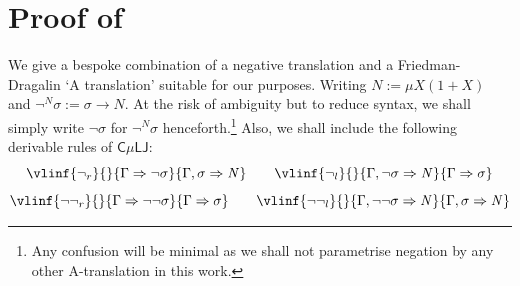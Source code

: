 \documentclass[10pt,a4paper]{amsart}
\theoremstyle{plain}
\theoremstyle{definition}
\newcommand{\dfn}{:=}
\theoremstyle{plain}
\theoremstyle{definition} %
\newcommand{\nat}{\mathit{N}}
\newcommand{\N}{\nat} %
\newcommand{\seqar}{\Rightarrow}
\newcommand{\id}{\mathsf{id}}
\newcommand{\ax}{\id}
\newcommand{\lr}[1]{#1_l}
\newcommand{\rr}[1]{#1_r}
\newcommand{\LJ}{\mathsf{LJ}}
\newcommand{\muLJ}{\mu\LJ}
\newcommand{\circular}{\mathsf C}
\newcommand{\cmuLJ}{\circular\muLJ}
\newcommand{\axiom}[2]{  \vlin{\ax}{}{{#1} \seqar {#2}}{\vlhy{}}}
\newcommand{\haxiom}[2]{ \vlhy{{#1} \seqar {#2}}}
\newcommand{\nega}[1]{\neg^{#1}}
\begin{document}
\section{Proof of~}\label{app:proofs-of-sec-circular-mulj}
% 
\label{subsec:proofs-of-cmulj-into-cmuljminus}



We give a bespoke combination of a negative translation and a Friedman-Dragalin `A translation' suitable for our purposes.
Writing $\N:= \mu X (1+X)$ and $\nega \N \sigma := \sigma \to \N$.
At the risk of ambiguity but to reduce syntax, we shall simply write $\neg \sigma$ for $\nega \N \sigma$ henceforth.\footnote{
Any confusion will be minimal as we shall not parametrise negation by any other A-translation in this work.} Also, we shall include the following derivable rules of $\cmuLJ$:
    \begin{equation}\label{eqn:negation-rules}
         \vlinf{\rr{\neg} }{}{\Gamma \seqar  \neg \sigma}{\Gamma, \sigma \seqar \N} 
 \qquad 
 \vlinf{\lr{\neg}}{}{\Gamma, \neg \sigma \seqar \N}{\Gamma \seqar \sigma}
    \end{equation}
\[
     \vlinf{\rr{\neg \neg} }{}{\Gamma \seqar \neg \neg \sigma}{\Gamma \seqar \sigma}   
     \qquad 
     \vlinf{\lr {\neg \neg }}{}{\Gamma, \neg\neg \sigma \seqar \N}{\Gamma, \sigma \seqar \N }
\]
\end{document}
